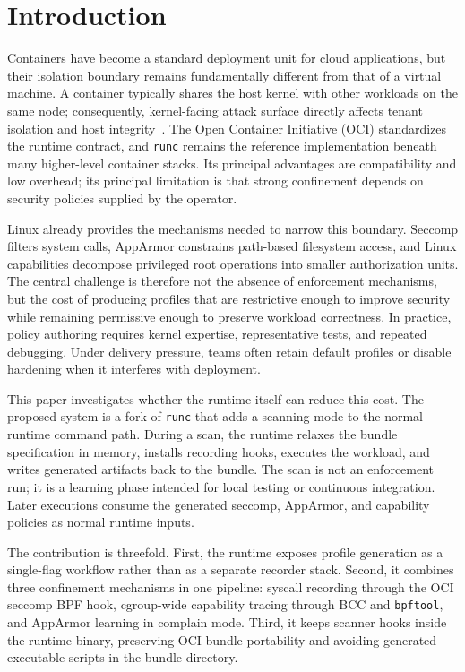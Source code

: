 \documentclass[runningheads]{llncs}
\begin{document}
\section{Introduction}

Containers have become a standard deployment unit for cloud applications, but their isolation boundary remains fundamentally different from that of a virtual machine. A container typically shares the host kernel with other workloads on the same node; consequently, kernel-facing attack surface directly affects tenant isolation and host integrity~\cite{wang2023,flauzac2020}. The Open Container Initiative (OCI) standardizes the runtime contract, and \texttt{runc} remains the reference implementation beneath many higher-level container stacks. Its principal advantages are compatibility and low overhead; its principal limitation is that strong confinement depends on security policies supplied by the operator.

Linux already provides the mechanisms needed to narrow this boundary. Seccomp filters system calls, AppArmor constrains path-based filesystem access, and Linux capabilities decompose privileged root operations into smaller authorization units. The central challenge is therefore not the absence of enforcement mechanisms, but the cost of producing profiles that are restrictive enough to improve security while remaining permissive enough to preserve workload correctness. In practice, policy authoring requires kernel expertise, representative tests, and repeated debugging. Under delivery pressure, teams often retain default profiles or disable hardening when it interferes with deployment.

This paper investigates whether the runtime itself can reduce this cost. The proposed system is a fork of \texttt{runc} that adds a scanning mode to the normal runtime command path. During a scan, the runtime relaxes the bundle specification in memory, installs recording hooks, executes the workload, and writes generated artifacts back to the bundle. The scan is not an enforcement run; it is a learning phase intended for local testing or continuous integration. Later executions consume the generated seccomp, AppArmor, and capability policies as normal runtime inputs.

The contribution is threefold. First, the runtime exposes profile generation as a single-flag workflow rather than as a separate recorder stack. Second, it combines three confinement mechanisms in one pipeline: syscall recording through the OCI seccomp BPF hook, cgroup-wide capability tracing through BCC and \texttt{bpftool}, and AppArmor learning in complain mode. Third, it keeps scanner hooks inside the runtime binary, preserving OCI bundle portability and avoiding generated executable scripts in the bundle directory.
\end{document}
